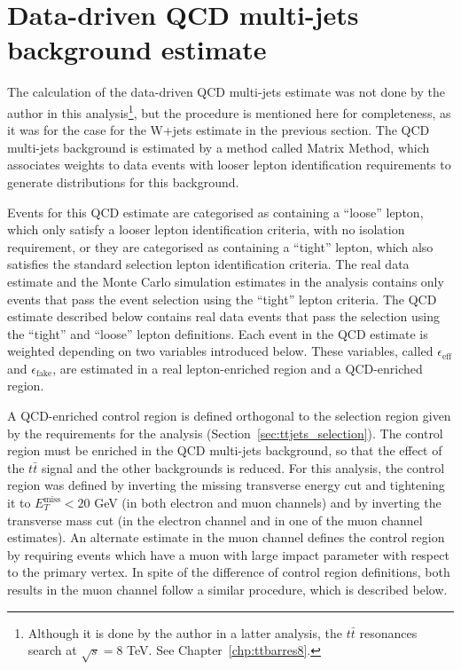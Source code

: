
\section{Data-driven QCD multi-jets background estimate}
\label{sec:ttjets_qcd}

The calculation of the data-driven QCD multi-jets estimate was not done by the author in this analysis\footnote{Although it is done by the author
in a latter analysis,
the $t\bar{t}$ resonances search at $\sqrt{s} = 8$ TeV. See Chapter~\ref{chp:ttbarres8}.}, but the procedure is mentioned here for completeness, as it was for the case for the W+jets estimate
in the previous section.
The QCD multi-jets background is estimated by a method called Matrix Method, which associates weights to data events with looser lepton
identification requirements to generate distributions for this background.

Events for this QCD estimate are categorised as containing a ``loose'' lepton, which only satisfy a
looser lepton identification criteria, with no isolation requirement, or they are categorised as containing a ``tight'' lepton,
which also satisfies the
standard selection lepton identification criteria.
The real data estimate and the Monte Carlo simulation estimates in the analysis contains only events that pass the
event selection using the ``tight'' lepton criteria. The QCD estimate described below contains real data events that pass the selection using the ``tight'' and ``loose'' lepton definitions. Each event in the QCD estimate
is weighted depending on two variables introduced below. These variables,
called $\epsilon_\textrm{eff}$ and $\epsilon_\textrm{fake}$,
are estimated in a real lepton-enriched region and a QCD-enriched region.

A QCD-enriched control region is defined orthogonal to the selection region given by
the requirements for the analysis (Section~\ref{sec:ttjets_selection}).
The control region must be enriched in the QCD multi-jets
background, so that the effect of the $t\bar{t}$ signal and the other backgrounds is reduced.
For this analysis, the control region was defined by inverting the missing transverse energy cut and tightening it to $E_T^{\textrm{miss}} < 20$ GeV (in both
electron and muon channels) and by inverting the
transverse mass cut (in the electron channel and in one of the muon channel estimates).
An alternate estimate in the muon channel defines
the control region by requiring events which have a muon with large impact parameter with respect to the primary vertex. In spite of the difference of control region definitions,
both results in the muon channel follow a similar procedure, which is described below.

